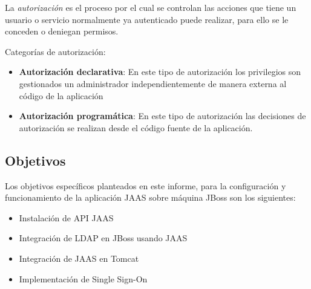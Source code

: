 \newpage

La \emph{autorización} es el proceso por el cual se controlan las acciones que tiene
un usuario o servicio normalmente ya autenticado puede realizar, para ello se le
conceden o deniegan permisos.

Categorías de autorización:
\begin{itemize}
    \item \textbf{Autorización declarativa}: En este tipo de autorización los privilegios son gestionados un administrador independientemente de manera externa al código de la aplicación
    \item \textbf{Autorización programática}: En este tipo de autorización las decisiones de autorización se realizan desde el código fuente de la aplicación.
\end{itemize}

\subsection{Objetivos}

Los objetivos específicos planteados en este informe, para la configuración y funcionamiento de la aplicación JAAS sobre máquina JBoss son los siguientes:

\begin{itemize}
	\item Instalación de API JAAS
	\item Integración de LDAP en JBoss usando JAAS
	\item Integración de JAAS en Tomcat
	\item Implementación de Single Sign-On
\end{itemize}
